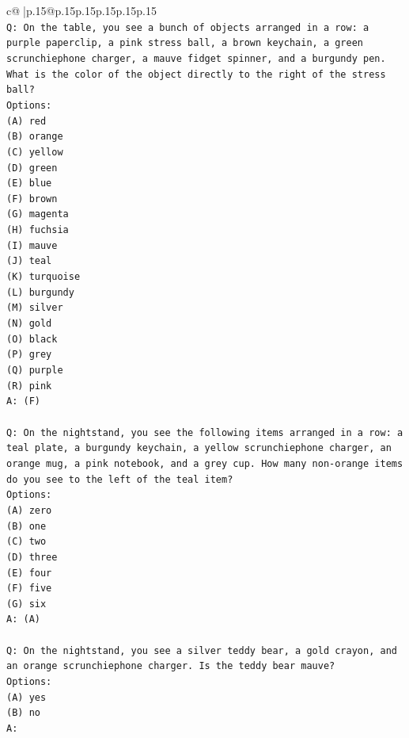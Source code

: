 \documentclass{article}
\begin{document}
{\begin{supertabular}{c@{$\;$}|p{.15\linewidth}@{}p{.15\linewidth}p{.15\linewidth}p{.15\linewidth}p{.15\linewidth}p{.15\linewidth}}
{{{\\ 
\texttt{Q: On the table, you see a bunch of objects arranged in a row: a purple paperclip, a pink stress ball, a brown keychain, a green scrunchiephone charger, a mauve fidget spinner, and a burgundy pen. What is the color of the object directly to the right of the stress ball?} \\
\texttt{Options:} \\
\texttt{(A) red} \\
\texttt{(B) orange} \\
\texttt{(C) yellow} \\
\texttt{(D) green} \\
\texttt{(E) blue} \\
\texttt{(F) brown} \\
\texttt{(G) magenta} \\
\texttt{(H) fuchsia} \\
\texttt{(I) mauve} \\
\texttt{(J) teal} \\
\texttt{(K) turquoise} \\
\texttt{(L) burgundy} \\
\texttt{(M) silver} \\
\texttt{(N) gold} \\
\texttt{(O) black} \\
\texttt{(P) grey} \\
\texttt{(Q) purple} \\
\texttt{(R) pink} \\
\texttt{A: (F)} \\
\\ 
\texttt{Q: On the nightstand, you see the following items arranged in a row: a teal plate, a burgundy keychain, a yellow scrunchiephone charger, an orange mug, a pink notebook, and a grey cup. How many non{-}orange items do you see to the left of the teal item?} \\
\texttt{Options:} \\
\texttt{(A) zero} \\
\texttt{(B) one} \\
\texttt{(C) two} \\
\texttt{(D) three} \\
\texttt{(E) four} \\
\texttt{(F) five} \\
\texttt{(G) six} \\
\texttt{A: (A)} \\
\\ 
\texttt{Q: On the nightstand, you see a silver teddy bear, a gold crayon, and an orange scrunchiephone charger. Is the teddy bear mauve?} \\
\texttt{Options:} \\
\texttt{(A) yes} \\
\texttt{(B) no} \\
\texttt{A:} \\
            }
        }
    }
     \\ \\


\end{supertabular}}
\end{document}
